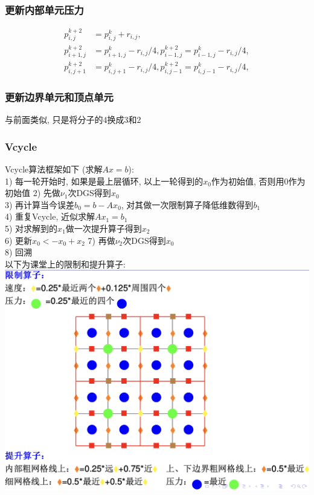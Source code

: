 \documentclass{article}
\begin{document}
\subsubsection*{更新内部单元压力}
\begin{align*}
p^{k+2}_{i,j} &= p^k_{i,j}+r_{i,j},\\
p^{k+2}_{i+1,j} &= p^k_{i+1,j}-r_{i,j}/4,
p^{k+2}_{i-1,j} = p^k_{i-1,j}-r_{i,j}/4,\\
p^{k+2}_{i,j+1} &= p^k_{i,j+1}-r_{i,j}/4,
p^{k+2}_{i,j-1} = p^k_{i,j-1}-r_{i,j}/4,
\end{align*}
\subsubsection*{更新边界单元和顶点单元}
与前面类似, 只是将分子的4换成3和2
\subsubsection{Vcycle}
Vcycle算法框架如下 (求解$Ax=b$):\\
1) 每一轮开始时, 如果是最上层循环, 以上一轮得到的$x_0$作为初始值, 否则用0作为初始值
2) 先做$\nu_1$次DGS得到$x_0$\\
3) 再计算当今误差$b_0=b-Ax_0$, 对其做一次限制算子降低维数得到$b_1$\\
4) 重复Vcycle, 近似求解$Ax_1=b_1$\\
5) 对求解到的$x_1$做一次提升算子得到$x_2$\\
6) 更新$x_0<-x_0+x_2$
7) 再做$\nu_2$次DGS得到$x_0$\\
8) 回溯\\
以下为课堂上的限制和提升算子:\\
\includegraphics[scale=0.5]{image/updownclass.png}\\
\end{document}
